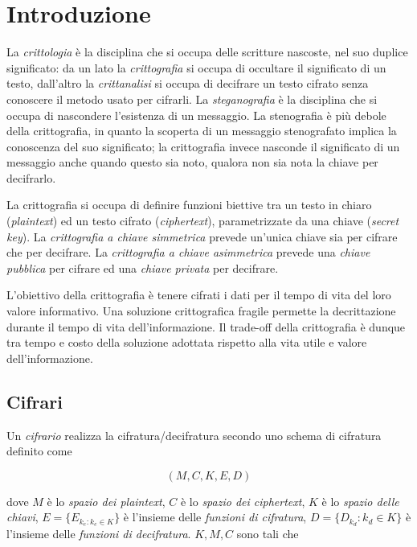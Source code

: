 \chapter{Introduzione}
\label{chp:introduction}

La \textit{crittologia} è la disciplina che si occupa delle scritture nascoste, nel suo duplice significato: da un lato la \textit{crittografia} si occupa di occultare il significato di un testo, dall'altro la \textit{crittanalisi} si occupa di decifrare un testo cifrato senza conoscere il metodo usato per cifrarli.
La \textit{steganografia} è la disciplina che si occupa di nascondere l'esistenza di un messaggio.
La stenografia è più debole della crittografia, in quanto la scoperta di un messaggio stenografato implica la conoscenza del suo significato; la crittografia invece nasconde il significato di un messaggio anche quando questo sia noto, qualora non sia nota la chiave per decifrarlo.

La crittografia si occupa di definire funzioni biettive tra un testo in chiaro (\textit{plaintext}) ed un testo cifrato (\textit{ciphertext}), parametrizzate da una chiave (\textit{secret key}). La \textit{crittografia a chiave simmetrica} prevede un'unica chiave sia per cifrare che per decifrare. La \textit{crittografia a chiave asimmetrica} prevede una \textit{chiave pubblica} per cifrare ed una \textit{chiave privata} per decifrare.

L'obiettivo della crittografia è tenere cifrati i dati per il tempo di vita del loro valore informativo. Una soluzione crittografica fragile permette la decrittazione durante il tempo di vita dell'informazione. Il trade-off della crittografia è dunque tra tempo e costo della soluzione adottata rispetto alla vita utile e valore dell'informazione.

\section{Cifrari}
Un \textit{cifrario} realizza la cifratura/decifratura secondo uno schema di cifratura definito come

\begin{equation}
  (M,C,K,E,D)
\end{equation}

dove
$M$ è lo \textit{spazio dei plaintext},
$C$ è lo \textit{spazio dei ciphertext},
$K$ è lo \textit{spazio delle chiavi},
$E=\{E_{k_{e}:k_{e}\in K}\}$ è l'insieme delle \textit{funzioni di cifratura},
$D=\{D_{k_d}:k_{d}\in K\}$ è l'insieme delle \textit{funzioni di decifratura}.
$K,M,C$ sono tali che 

